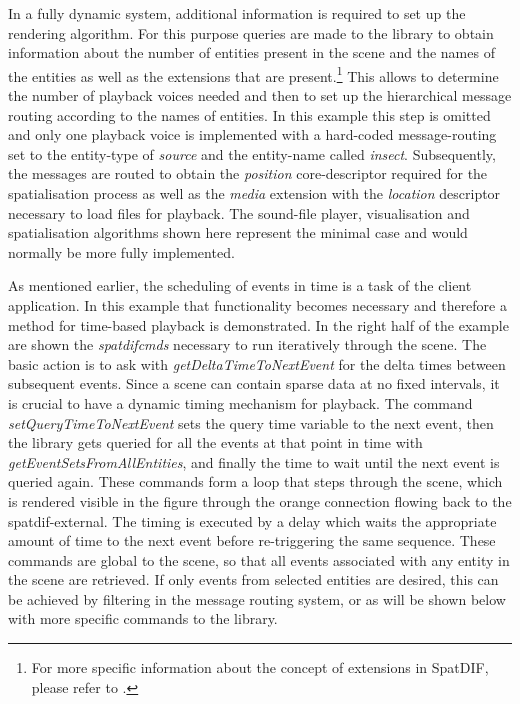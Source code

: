 \documentclass{article}
\begin{document}
In a fully dynamic system, additional information is required to set up the rendering algorithm.
For this purpose queries are made to the library to obtain information about the number of entities present in the scene and the names of the entities as well as the extensions that are present.\footnote{For more specific information about the concept of extensions in SpatDIF, please refer to \cite{SpatDIF_SMC12, Peters:2013SpatDifCMJ, SpatDIF_03}. }
This allows to determine the number of playback voices needed and then to set up the hierarchical message routing according to the names of entities.
In this example this step is omitted and only one playback voice is implemented with a hard-coded message-routing set to the entity-type of \emph{source} and the entity-name called \emph{insect}.
Subsequently, the messages are routed to obtain the \emph{position} core-descriptor required for the spatialisation process as well as the \emph{media} extension with the \emph{location} descriptor necessary to load files for playback.
The sound-file player, visualisation and spatialisation algorithms \cite{Schacher_ICMC_2006} shown here represent the minimal case and would normally be more fully implemented. %

As mentioned earlier, the scheduling of events in time is a task of the client application. 
In this example that functionality becomes necessary and therefore a method for time-based playback is demonstrated.
In the right half of the example are shown the \emph{spatdifcmds} necessary to run iteratively through the scene.
The basic action is to ask with \emph{getDeltaTimeToNextEvent} for the delta times between subsequent events.
Since a scene can contain sparse data at no fixed intervals, it is crucial to have a dynamic timing mechanism for playback.
The command \emph{setQueryTimeToNextEvent} sets the query time variable to the next event, then the library gets queried for all the events at that point in time with \emph{getEventSetsFromAllEntities}, and finally the time to wait until the next event is queried again.
These commands form a loop that steps through the scene, which is rendered visible in the figure through the orange connection flowing back to the spatdif-external.
The timing is executed by a delay which waits the appropriate amount of time to the next event before re-triggering the same sequence.
These commands are global to the scene, so that all events associated with any entity in the scene are retrieved.
If only events from selected entities are desired, this can be achieved by filtering in the message routing system, or as will be shown below with more specific commands to the library. %
\end{document}
